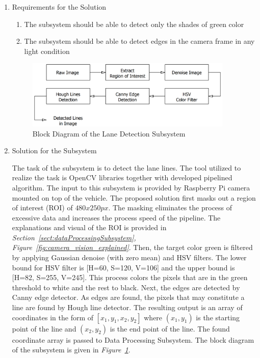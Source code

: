\documentclass[a4paper,12pt]{article}
\begin{document}
			\begin{enumerate}
			\item {Requirements for the Solution}

				
		
		
			
			\begin{enumerate}
				\item The subsystem should be able to detect only the shades of green color
				\item The subsystem should be able to detect edges in the camera frame in any light condition

			\end{enumerate}
			
		
			
			\begin{figure}[h]
			\includegraphics[width=0.93\textwidth,center]{images/vModels/laneDetection_subsystem}
			\caption{Block Diagram of the Lane Detection Subsystem}\label{fig:lane_detection_subsystem}
		\end{figure}
		
			
			
			\item {Solution for the Subsystem}
			
			The task of the subsystem is to detect the lane lines. The tool utilized to realize the task is OpenCV libraries together with developed pipelined algorithm.
			 The input to this subsystem is provided by Raspberry Pi camera mounted on top of the vehicle. The proposed solution first masks out a region of interest (ROI) of $480x250 px$. The masking eliminates the process of excessive data and increases the process speed of the pipeline. The explanations and visual of the ROI is provided in \textit{Section~\ref{sect:dataProcessingSubsystem}, Figure~\ref{fig:camera_vision_explained}}. Then, the target color green is filtered by applying Gaussian denoise (with zero mean) and HSV filters. The lower bound for HSV filter is [H=60, S=120, V=106] and the upper bound is [H=82, S=255, V=245]. This process colors the pixels that are in the green threshold to white and the rest to black. Next, the edges are detected by Canny edge detector. As edges are found, the pixels that may constitute a line are found by Hough line detector. The resulting output is an array of coordinates in the form of $[x_1, y_1, x_2, y_2]$ where $(x_1, y_1)$ is the starting point of the line and $(x_2, y_2)$ is the end point of the line. The found coordinate array is passed to Data Processing Subsystem. The block diagram of the subsystem is given in \textit{Figure~\ref{fig:lane_detection_subsystem}}.
		

\end{enumerate}
\end{document}
